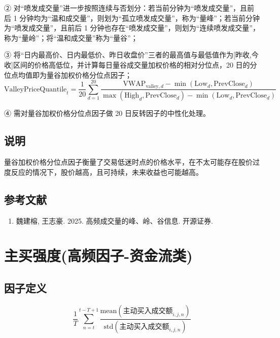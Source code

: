 \documentclass{article}
\begin{document}
② 对“喷发成交量”进一步按照连续与否划分：若当前分钟为“喷发成交量”，且前后 1 分钟均为“温和成交量”，则划为“孤立喷发成交量”，称为“量峰”；若当前分钟为“喷发成交量”，且前后 1 分钟也存在“喷发成交量”，则划为“连续喷发成交量”，称为“量岭”；将“温和成交量”称为“量谷”；

③ 将“日内最高价、日内最低价、昨日收盘价”三者的最高值与最低值作为[昨收,今收]区间的价格高低位，并计算每日量谷成交量加权价格的相对分位点，20 日的分位点均值即为量谷加权价格分位点因子；
\begin{equation}
    \mathrm{ValleyPriceQuantile}_t = \frac{1}{20} \sum_{d=1}^{20} \frac{\mathrm{VWAP}_{\mathrm{valley},d} - \min(\mathrm{Low}_d, \mathrm{PrevClose}_d)}{\max(\mathrm{High}_d, \mathrm{PrevClose}_d) - \min(\mathrm{Low}_d, \mathrm{PrevClose}_d)}
\end{equation}

④ 需对量谷加权价格分位点因子做 20 日反转因子的中性化处理。

\subsection{说明}
量谷加权价格分位点因子衡量了交易低迷时点的价格水平，在不太可能存在股价过度反应的情况下，股价越高，且可持续，未来收益也可能越高。

\subsection{参考文献}
\begin{enumerate}
    \item 魏建榕, 王志豪. 2025. 高频成交量的峰、岭、谷信息. 开源证券.
\end{enumerate}

\section{主买强度(高频因子-资金流类)}

\subsection{因子定义}

\begin{equation}
    \frac{1}{T} \sum_{n=t}^{t-T+1} \frac{\mathrm{mean}(\text{主动买入成交额}_{i,j,n})}{\mathrm{std}(\text{主动买入成交额}_{i,j,n})}
\end{equation}
\end{document}
